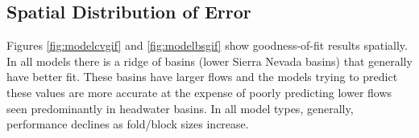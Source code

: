 
\subsection{Spatial Distribution of Error}
Figures \ref{fig:modelcvgif} and \ref{fig:modelbsgif} show goodness-of-fit results spatially. In all models there is a ridge of basins (lower Sierra Nevada basins) that generally have better fit. These basins have larger flows and the models trying to predict these values are more accurate at the expense of poorly predicting lower flows seen predominantly in headwater basins. In all model types, generally, performance declines as fold/block sizes increase. 

